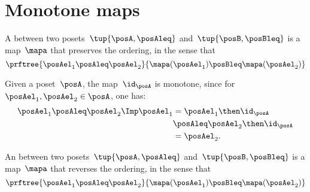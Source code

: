 \section{Monotone maps}\label{sec:monotonicity-monotone-maps}

\begin{definition}
  \label{def:monotone}
  A \emph{} between two posets~$\tup{\posA, \posAleq}$ and~$\tup{\posB, \posBleq}$ is a map~$\mapa$ that preserves the ordering, in the sense that
  \begin{equation}
    \prftree{\posAel_1 \posAleq \posAel_2 }{\mapa(\posAel_1) \posBleq \mapa(\posAel_2)}
  \end{equation}
\end{definition}
\begin{remark}
  Given a poset~$\posA$, the map~$\id_\posA$ is monotone, since for~$\posAel_1,\posAel_2\in \posA$, one has:
  \begin{equation*}
    \begin{aligned}
      \posAel_1\posAleq \posAel_2 \Imp \posAel_1&=\posAel_1\then \id_\posA\\
      &\posAleq \posAel_2\then \id_\posA \\
      &= \posAel_2.
    \end{aligned}
  \end{equation*}
\end{remark}

\begin{definition}
  \label{def:antitone}
  An \emph{} between two posets~$\tup{\posA, \posAleq}$ and~$\tup{\posB, \posBleq}$ is a map~$\mapa$ that reverses the ordering, in the sense that
  \begin{equation}
    \prftree{\posAel_1 \posAleq \posAel_2}{\mapa(\posAel_1) \posBleq \mapa(\posAel_2)}
  \end{equation}
\end{definition}


\begin{comment}
  A monotone map is an \emph{order isomorphism} if the other direction
  of the implication holds as well:
  \begin{equation}
    a \leq_A b \quad \Leftrightarrow \quad f(a) \leq_B f(b).
  \end{equation}
\end{comment}

